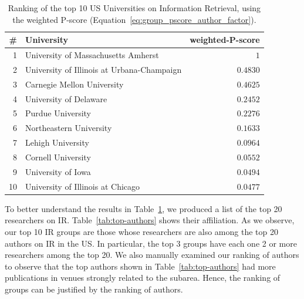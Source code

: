 \documentclass[msc]{ppgccufmg}
\begin{document}
\begin{table}[htbp]
\centering
\caption{Ranking of the top 10 US Universities on Information Retrieval, using the weighted P-score (Equation~\ref{eq:group_pscore_author_factor}).}
\label{tab:top10-ir}
\begin{tabular}{rlr}
	\toprule
	\# & University                                 & \multicolumn{1}{c}{weighted-P-score} \\
	\midrule
	1  & University of Massachusetts Amherst        & $1$                         \\
	2  & University of Illinois at Urbana-Champaign & $0.4830$                    \\
	3  & Carnegie Mellon University                 & $0.4625$                    \\
	4  & University of Delaware                     & $0.2452$                    \\
	5  & Purdue University                          & $0.2276$                    \\
	6  & Northeastern University                    & $0.1633$                    \\
	7  & Lehigh University                          & $0.0964$                    \\
	8  & Cornell University                         & $0.0552$                    \\
	9  & University of Iowa                         & $0.0494$                    \\
	10 & University of Illinois at Chicago          & $0.0477$                    \\
	\bottomrule
\end{tabular}
\end{table}

To better understand the results in Table~\ref{tab:top10-ir}, we produced a list of the top 20 researchers on IR. Table~\ref{tab:top-authors} shows their affiliation. As we observe, our top 10 IR groups are those whose researchers are also among the top 20 authors on IR in the US. In particular, the top 3 groups have each one 2 or more researchers among the top 20. 
%
We also manually examined our ranking of authors to observe that the top authors shown in Table~\ref{tab:top-authors} had more publications in venues strongly related to the subarea. Hence, the ranking of groups can be justified by the ranking of authors. 
\end{document}
